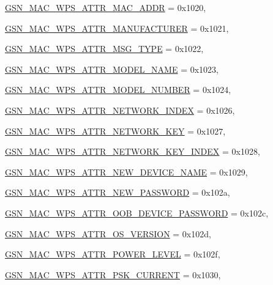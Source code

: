 \begin{DoxyCompactItemize}
\par
\hyperlink{a00642_gga0ae19d69a0b381d883890df8a7812414ae08e8ebd8144290f405ddd039d50d4a1}{GSN\_\-MAC\_\-WPS\_\-ATTR\_\-MAC\_\-ADDR} =  0x1020, 
\par
\hyperlink{a00642_gga0ae19d69a0b381d883890df8a7812414a56e395ae5ad56ebcdf3a3daf60508705}{GSN\_\-MAC\_\-WPS\_\-ATTR\_\-MANUFACTURER} =  0x1021, 
\par
\hyperlink{a00642_gga0ae19d69a0b381d883890df8a7812414aad2c6f083e5d168e417eaeaec60e1188}{GSN\_\-MAC\_\-WPS\_\-ATTR\_\-MSG\_\-TYPE} =  0x1022, 
\par
\hyperlink{a00642_gga0ae19d69a0b381d883890df8a7812414a00711c771bb3f70aca7c5590d8be46a5}{GSN\_\-MAC\_\-WPS\_\-ATTR\_\-MODEL\_\-NAME} =  0x1023, 
\par
\hyperlink{a00642_gga0ae19d69a0b381d883890df8a7812414a747ceda35756847af00e4c08aa9ddb6b}{GSN\_\-MAC\_\-WPS\_\-ATTR\_\-MODEL\_\-NUMBER} =  0x1024, 
\par
\hyperlink{a00642_gga0ae19d69a0b381d883890df8a7812414a95ce2bb8157589dccf214d78e7bfe089}{GSN\_\-MAC\_\-WPS\_\-ATTR\_\-NETWORK\_\-INDEX} =  0x1026, 
\par
\hyperlink{a00642_gga0ae19d69a0b381d883890df8a7812414a6335ff86b286abd89e8357c3a38e4cfa}{GSN\_\-MAC\_\-WPS\_\-ATTR\_\-NETWORK\_\-KEY} =  0x1027, 
\par
\hyperlink{a00642_gga0ae19d69a0b381d883890df8a7812414ab3412060b43412458c32ae279dafab42}{GSN\_\-MAC\_\-WPS\_\-ATTR\_\-NETWORK\_\-KEY\_\-INDEX} =  0x1028, 
\par
\hyperlink{a00642_gga0ae19d69a0b381d883890df8a7812414a53315d91cf0bccd56a5df8903b4b1e3c}{GSN\_\-MAC\_\-WPS\_\-ATTR\_\-NEW\_\-DEVICE\_\-NAME} =  0x1029, 
\par
\hyperlink{a00642_gga0ae19d69a0b381d883890df8a7812414a63fe81cf6d0077c4dd62fdf2397f628f}{GSN\_\-MAC\_\-WPS\_\-ATTR\_\-NEW\_\-PASSWORD} =  0x102a, 
\par
\hyperlink{a00642_gga0ae19d69a0b381d883890df8a7812414a4a27af7c5d1724ce0f641ac86d401f86}{GSN\_\-MAC\_\-WPS\_\-ATTR\_\-OOB\_\-DEVICE\_\-PASSWORD} =  0x102c, 
\par
\hyperlink{a00642_gga0ae19d69a0b381d883890df8a7812414a248764365b811e501fa52e7175fd15f1}{GSN\_\-MAC\_\-WPS\_\-ATTR\_\-OS\_\-VERSION} =  0x102d, 
\par
\hyperlink{a00642_gga0ae19d69a0b381d883890df8a7812414a759d95dbbd54effd023e9c7dac8e5ccc}{GSN\_\-MAC\_\-WPS\_\-ATTR\_\-POWER\_\-LEVEL} =  0x102f, 
\par
\hyperlink{a00642_gga0ae19d69a0b381d883890df8a7812414ab5034f8c8b189c17df7ad8f014598d6e}{GSN\_\-MAC\_\-WPS\_\-ATTR\_\-PSK\_\-CURRENT} =  0x1030, 

\end{DoxyCompactItemize}
